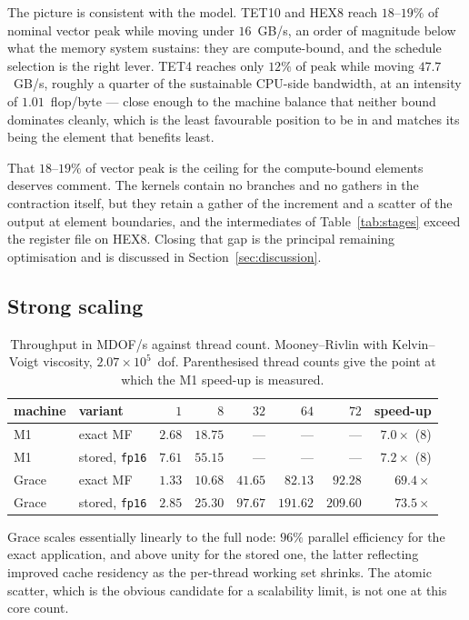 \documentclass[11pt]{article}
\begin{document}
The picture is consistent with the model.  TET10 and HEX8 reach $18$--$19\%$ of
nominal vector peak while moving under $16$~GB/s, an order of magnitude below
what the memory system sustains: they are compute-bound, and the schedule
selection is the right lever.  TET4 reaches only $12\%$ of peak while moving
$47.7$~GB/s, roughly a quarter of the sustainable CPU-side bandwidth, at an
intensity of $1.01$~flop/byte --- close enough to the machine balance that
neither bound dominates cleanly, which is the least favourable position to be
in and matches its being the element that benefits least.

That $18$--$19\%$ of vector peak is the ceiling for the compute-bound elements
deserves comment.  The kernels contain no branches and no gathers in the
contraction itself, but they retain a gather of the increment and a scatter of
the output at element boundaries, and the intermediates of
Table~\ref{tab:stages} exceed the register file on HEX8.  Closing that gap is the
principal remaining optimisation and is discussed in Section~\ref{sec:discussion}.

\subsection{Strong scaling}
\label{sec:scaling}

\begin{table}[ht]
\centering
\begin{tabular}{llrrrrrr}
\toprule
machine & variant & $1$ & $8$ & $32$ & $64$ & $72$ & speed-up \\
\midrule
M1    & exact MF              & $2.68$ & $18.75$ & ---     & ---      & ---      & $7.0\times$ (8) \\
M1    & stored, \texttt{fp16} & $7.61$ & $55.15$ & ---     & ---      & ---      & $7.2\times$ (8) \\
Grace & exact MF              & $1.33$ & $10.68$ & $41.65$ & $ 82.13$ & $ 92.28$ & $69.4\times$ \\
Grace & stored, \texttt{fp16} & $2.85$ & $25.30$ & $97.67$ & $191.62$ & $209.60$ & $73.5\times$ \\
\bottomrule
\end{tabular}
\caption{Throughput in MDOF/s against thread count.  Mooney--Rivlin with
Kelvin--Voigt viscosity, $2.07\times10^{5}$~dof.  Parenthesised thread counts
give the point at which the M1 speed-up is measured.}
\label{tab:scaling}
\end{table}

Grace scales essentially linearly to the full node: $96\%$ parallel efficiency
for the exact application, and above unity for the stored one, the latter
reflecting improved cache residency as the per-thread working set shrinks.  The
atomic scatter, which is the obvious candidate for a scalability limit, is not
one at this core count.
\end{document}
